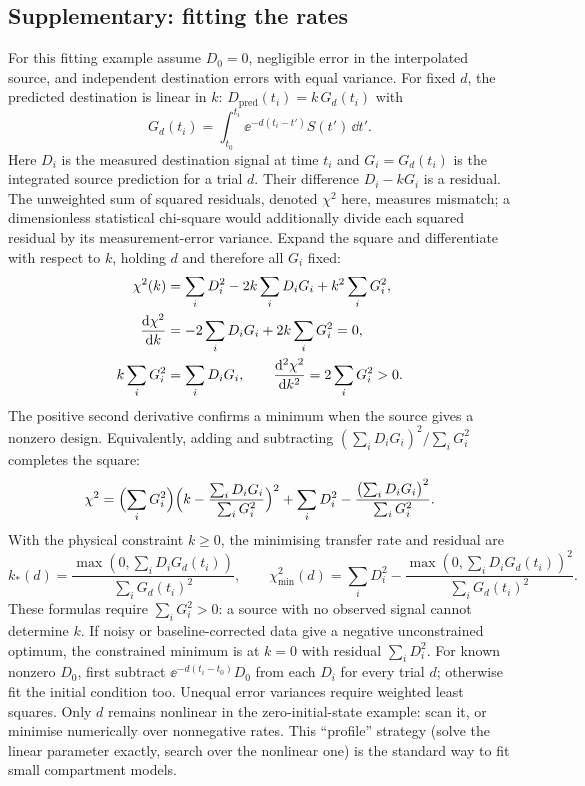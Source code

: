 \subsection{Supplementary: fitting the rates}\label{subsec:lec02:fitting}
For this fitting example assume $D_0=0$, negligible error in the interpolated source, and independent destination errors with equal variance. For fixed $d$, the predicted destination is linear in $k$: $D_{\mathrm{pred}}(t_i)=k\,G_d(t_i)$ with
\begin{equation}\label{eq:lec02:G}
G_d(t_i)=\int_{t_0}^{t_i}\ee^{-d(t_i-t')}S(t')\,\dd t'.
\end{equation}
Here $D_i$ is the measured destination signal at time $t_i$ and $G_i=G_d(t_i)$ is the integrated source prediction for a trial $d$. Their difference $D_i-kG_i$ is a residual. The unweighted sum of squared residuals, denoted $\chi^2$ here, measures mismatch; a dimensionless statistical chi-square would additionally divide each squared residual by its measurement-error variance. Expand the square and differentiate with respect to $k$, holding $d$ and therefore all $G_i$ fixed:
\begin{align}
\chi^2(k)&=\sum_iD_i^2-2k\sum_iD_iG_i+k^2\sum_iG_i^2,\notag\\
\frac{\mathrm{d}\chi^2}{\mathrm{d} k}&=-2\sum_iD_iG_i+2k\sum_iG_i^2=0,\notag\\
k\sum_iG_i^2&=\sum_iD_iG_i,\qquad
\frac{\mathrm{d}^2\chi^2}{\mathrm{d} k^2}=2\sum_iG_i^2>0.\label{eq:lec02:least-squares-steps}
\end{align}
The positive second derivative confirms a minimum when the source gives a nonzero design. Equivalently, adding and subtracting $(\sum_iD_iG_i)^2/\sum_iG_i^2$ completes the square:
\begin{equation}\label{eq:lec02:chi2}
\chi^2=\Bigl(\sum_iG_i^2\Bigr)\Bigl(k-\frac{\sum_iD_iG_i}{\sum_iG_i^2}\Bigr)^2
+\sum_iD_i^2-\frac{\bigl(\sum_iD_iG_i\bigr)^2}{\sum_iG_i^2}.
\end{equation}
With the physical constraint $k\geq0$, the minimising transfer rate and residual are
\begin{equation}\label{eq:lec02:fit-k}
\boxed{k_*(d)=\frac{\max(0,\sum_iD_iG_d(t_i))}{\sum_iG_d(t_i)^2},
\qquad
\chi^2_{\min}(d)=\sum_iD_i^2-\frac{\max(0,\sum_iD_iG_d(t_i))^2}{\sum_iG_d(t_i)^2}.}
\end{equation}
These formulas require $\sum_iG_i^2>0$: a source with no observed signal cannot determine $k$. If noisy or baseline-corrected data give a negative unconstrained optimum, the constrained minimum is at $k=0$ with residual $\sum_iD_i^2$. For known nonzero $D_0$, first subtract $\ee^{-d(t_i-t_0)}D_0$ from each $D_i$ for every trial $d$; otherwise fit the initial condition too. Unequal error variances require weighted least squares. Only $d$ remains nonlinear in the zero-initial-state example: scan it, or minimise numerically over nonnegative rates. This ``profile'' strategy (solve the linear parameter exactly, search over the nonlinear one) is the standard way to fit small compartment models.

